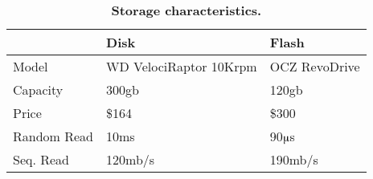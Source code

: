 \begin{table}
  \centering
  \begin{tabular}{ l l l }
  \toprule
   & Disk & Flash \\
   \midrule
   Model & WD VelociRaptor 10Krpm & OCZ RevoDrive \\
   Capacity & 300gb & 120gb \\
   Price & \$164 & \$300 \\
   Random Read & 10ms & 90$\muup$s \\
   Seq. Read & 120mb/s & 190mb/s \\
  \bottomrule
  \end{tabular}

  \caption{\textbf{Storage characteristics.}}
  \label{table:DiskCharacteristics}
\end{table}
